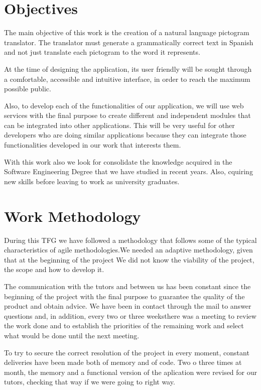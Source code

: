 \section{Objectives}

The main objective of this work is the creation of a natural language pictogram translator. The translator must generate a grammatically correct text in Spanish and not just translate each pictogram to the word it represents.

At the time of designing the application, its user friendly will be sought through a comfortable, accessible and intuitive interface, in order to reach the maximum possible public.

Also, to develop each of the functionalities of our application, we will use web services with the final purpose to create different and independent modules  that can be integrated into other applications. This will be very useful for other developers who are doing similar applications because they can integrate those functionalities developed in our work that interests them.

With this work also we look for consolidate the knowledge acquired in the Software Engineering Degree that we have studied in recent years. Also, cquiring new skills before leaving to work as university graduates.


\section {Work Methodology}

During this TFG we have followed a methodology that follows some of the typical characteristics of agile methodologies.We needed an adaptive methodology, given that at the beginning of the project 
We did not know the viability of the project, the scope and how to develop it.

The communication with the tutors and between us has been constant since the beginning of the project with the final purpose to guarantee the quality of the product and obtain advice. We have been in contact through the mail to answer questions and, in addition, every two or three weeksthere was a meeting to review the work done and to establish the priorities of the remaining work and select what would be done until the next meeting.

To try to secure the correct resolution of the project in every moment,  constant deliveries have been made both of memory and of code. Two o three times at month, the memory and a functional version of the aplication were revised for our tutors, checking that way if we were going to right way.

